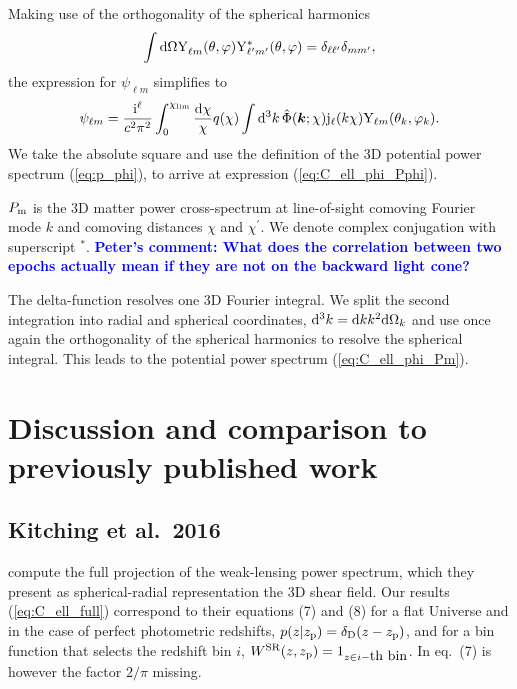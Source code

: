 \documentclass[fleqn,usenatbib]{mnras} %
\renewcommand{\vec}{\bm}
\newcommand{\mk}[1]{{\bf\textcolor{blue}{#1}}}
\begin{document}
\begin{appendix}
Making use of the orthogonality of the spherical harmonics
%
%
\begin{equation}
  \int {\rm d} \Omega {\rm Y}^{}_{\ell m}(\theta, \varphi) {\rm Y}^\ast_{\ell^\prime m^\prime}(\theta, \varphi) = \delta_{\ell \ell^\prime} \delta_{m m^\prime},
  \label{eq:Yellm_ortho}
\end{equation}
%
the expression for $\psi_{\ell m}$ simplifies to
%
\begin{equation}
  \psi_{\ell m} = \frac {{\rm i}^\ell}{c^2 \pi^2} \int_0^{\chi_{\rm lim}} \frac{{\rm d}\chi}{\chi} q(\chi) \int {\rm d}^3 k \,
    \hat \Phi(\vec k; \chi) {\rm j}_\ell(k \chi) {\rm Y}_{\ell m}(\theta_k, \varphi_k).
  \label{eq:psi_ellm}
\end{equation}
%
We take the absolute square and use the definition of the 3D potential power spectrum (\ref{eq:p_phi}),
to arrive at expression (\ref{eq:C_ell_phi_Pphi}).

$P_{\rm m}$ is the 3D matter power cross-spectrum at line-of-sight comoving
Fourier mode $k$ and comoving distances $\chi$ and $\chi^\prime$. We denote
complex conjugation with superscript $^\ast$.
\mk{Peter's comment: What does the correlation between two epochs actually mean if they
are not on the backward light cone?}

The delta-function resolves one 3D Fourier
integral. We split the second integration into radial and spherical
coordinates, ${\rm d}^3 k = {\rm d} k k^2 {\rm d} \Omega_k$ and use once again
the orthogonality of the spherical harmonics to resolve the spherical integral. 
This leads to the potential power spectrum (\ref{eq:C_ell_phi_Pm}).




\section{Discussion and comparison to previously published work}
\label{app:B}

\subsection{Kitching et al.~2016}

\cite{2016arXiv161104954K} compute the full projection of the weak-lensing power
spectrum, which they present as spherical-radial representation the 3D shear field.
Our results (\ref{eq:C_ell_full}) correspond to their equations (7) and (8)
for a flat Universe and in the case of perfect
photometric redshifts, $p(z | z_{\rm p}) = \delta_{\rm D}(z - z_{\rm p})$, and
for a bin function that selects the redshift bin $i$, $W^{\rm SR}(z, z_{\rm p})
= 1_{z \in i-\mbox{th bin}}$. In \cite{2016arXiv161104954K} eq.~(7) is however the
factor $2/\pi$ missing.


\end{appendix}
\end{document}
